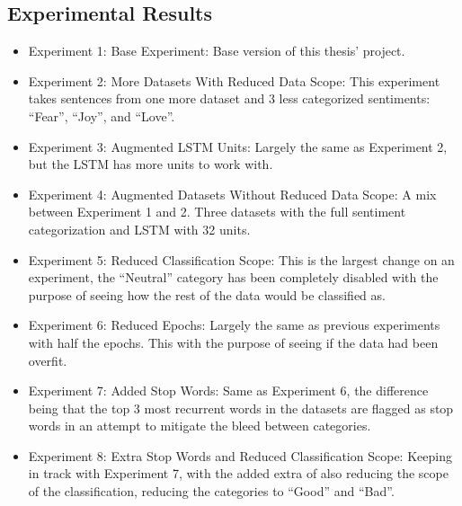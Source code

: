 \documentclass[review]{elsarticle} %
\begin{document}
\subsection{Experimental Results}
\begin{itemize}
\item Experiment 1: Base Experiment: Base version of this thesis' project.
\item Experiment 2: More Datasets With Reduced Data Scope: This experiment takes sentences from one more dataset and 3 less categorized sentiments: ``Fear'', ``Joy'', and ``Love''.
\item Experiment 3: Augmented LSTM Units: Largely the same as Experiment 2, but the LSTM has more units to work with.
\item Experiment 4: Augmented Datasets Without Reduced Data Scope: A mix between Experiment 1 and 2. Three datasets with the full sentiment categorization and LSTM with 32 units.
\item Experiment 5: Reduced Classification Scope: This is the largest change on an experiment, the ``Neutral'' category has been completely disabled with the purpose of seeing how the rest of the data would be classified as.
\item Experiment 6: Reduced Epochs: Largely the same as previous experiments with half the epochs. This with the purpose of seeing if the data had been overfit.
\item Experiment 7: Added Stop Words: Same as Experiment 6, the difference being that the top 3 most recurrent words in the datasets are flagged as stop words in an attempt to mitigate the bleed between categories.
\item Experiment 8: Extra Stop Words and Reduced Classification Scope: Keeping in track with Experiment 7, with the added extra of also reducing the scope of the classification, reducing the categories to ``Good'' and ``Bad''.
\end{itemize}
\end{document}
